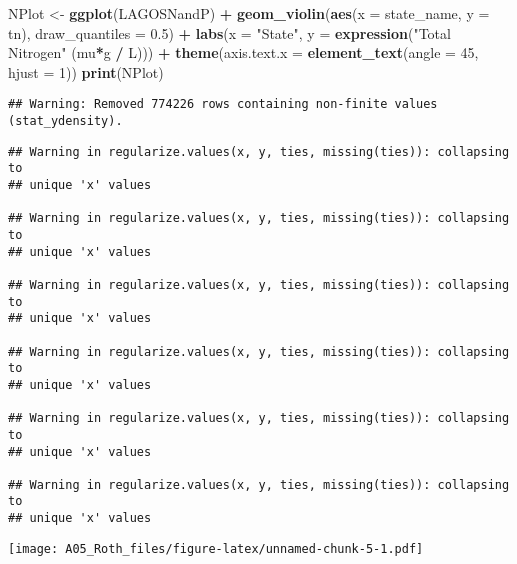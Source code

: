 \documentclass[]{article}
\newenvironment{Shaded}{\begin{snugshade}}{\end{snugshade}}
\newcommand{\DataTypeTok}[1]{\textcolor[rgb]{0.13,0.29,0.53}{#1}}
\newcommand{\DecValTok}[1]{\textcolor[rgb]{0.00,0.00,0.81}{#1}}
\newcommand{\FloatTok}[1]{\textcolor[rgb]{0.00,0.00,0.81}{#1}}
\newcommand{\KeywordTok}[1]{\textcolor[rgb]{0.13,0.29,0.53}{\textbf{#1}}}
\newcommand{\NormalTok}[1]{#1}
\newcommand{\OperatorTok}[1]{\textcolor[rgb]{0.81,0.36,0.00}{\textbf{#1}}}
\newcommand{\StringTok}[1]{\textcolor[rgb]{0.31,0.60,0.02}{#1}}
\begin{document}
\begin{Shaded}
\begin{Highlighting}[]
\NormalTok{NPlot <-}\StringTok{ }\KeywordTok{ggplot}\NormalTok{(LAGOSNandP) }\OperatorTok{+}
\StringTok{  }\KeywordTok{geom_violin}\NormalTok{(}\KeywordTok{aes}\NormalTok{(}\DataTypeTok{x =}\NormalTok{ state_name, }\DataTypeTok{y =}\NormalTok{ tn), }\DataTypeTok{draw_quantiles =} \FloatTok{0.5}\NormalTok{) }\OperatorTok{+}
\StringTok{  }\KeywordTok{labs}\NormalTok{(}\DataTypeTok{x =} \StringTok{"State"}\NormalTok{, }\DataTypeTok{y =}  \KeywordTok{expression}\NormalTok{(}\StringTok{"Total Nitrogen"}\NormalTok{ (mu}\OperatorTok{*}\NormalTok{g }\OperatorTok{/}\StringTok{ }\NormalTok{L))) }\OperatorTok{+}
\StringTok{  }\KeywordTok{theme}\NormalTok{(}\DataTypeTok{axis.text.x =} \KeywordTok{element_text}\NormalTok{(}\DataTypeTok{angle =} \DecValTok{45}\NormalTok{, }\DataTypeTok{hjust =} \DecValTok{1}\NormalTok{))}
\KeywordTok{print}\NormalTok{(NPlot)}
\end{Highlighting}
\end{Shaded}

\begin{verbatim}
## Warning: Removed 774226 rows containing non-finite values (stat_ydensity).
\end{verbatim}

\begin{verbatim}
## Warning in regularize.values(x, y, ties, missing(ties)): collapsing to
## unique 'x' values

## Warning in regularize.values(x, y, ties, missing(ties)): collapsing to
## unique 'x' values

## Warning in regularize.values(x, y, ties, missing(ties)): collapsing to
## unique 'x' values

## Warning in regularize.values(x, y, ties, missing(ties)): collapsing to
## unique 'x' values

## Warning in regularize.values(x, y, ties, missing(ties)): collapsing to
## unique 'x' values

## Warning in regularize.values(x, y, ties, missing(ties)): collapsing to
## unique 'x' values
\end{verbatim}

\texttt{[image: A05\_Roth\_files/figure-latex/unnamed-chunk-5-1.pdf]}
\end{document}
